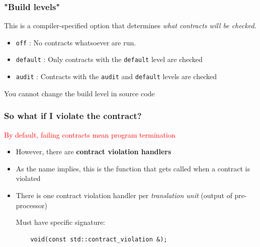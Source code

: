 \documentclass{beamer}
\begin{document}
\begin{frame}
\frametitle{"Build levels"}

This is a compiler-specified option that determines \textit{what contracts will be checked}.

\begin{itemize}
\item \texttt{off} : No contracts whatsoever are run.

\item \texttt{default} : Only contracts with the \texttt{default} level are checked

\item \texttt{audit} : Contracts with the \texttt{audit} and \texttt{default} levels are checked
\end{itemize}

\vspace{2em}
You {\Large{cannot}} change the build level in source code

\end{frame}


\begin{frame}[fragile]
\frametitle{So what if I violate the contract?}

\textcolor{red}{By default, failing contracts mean program termination}
\vspace{1em}
\begin{itemize}
\setlength\itemsep{1.5em}
\item However, there are \textbf{contract violation handlers}

\item As the name implies, this is the function that gets called when a contract is violated

\item There is one contract violation handler per \textit{translation unit} (output of pre-processor)

Must have specific signature:

\begin{lstlisting}
    void(const std::contract_violation &);
\end{lstlisting}

\end{itemize}
\end{frame}
\end{document}

